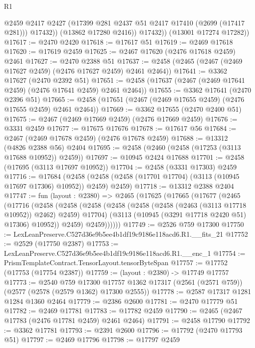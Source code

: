 \begin{lexlean}{R1}
\begin{coremodule}
                @2459
                @2417
                @2427
                (@17399 @281 @2437 @51 @2417 @17410 (@2699 (@17417 @281)))
                @17432))
            (@13862 @17280 @2416))
          @17432))
      (@13001 @17274 @17282))
@17617 := @2470 @2420
@17618 := @17617 @51
@17619 := @2469 @17618
@17620 := @17619 @2459
@17625 := @2467 @17620 (@2476 @17618 @2459) @2461
@17627 := @2470 @2388 @51
@17637 := @2458 (@2465 (@2467 (@2469 @17627 @2459) (@2476 @17627 @2459) @2461 @2464))
@17641 := @3362 @17627 (@2470 @2392 @51)
@17651 := @2458 (@17637 (@2467 (@2469 @17641 @2459) (@2476 @17641 @2459) @2461 @2464))
@17655 := @3362 @17641 (@2470 @2396 @51)
@17665 := @2458 (@17651 (@2467 (@2469 @17655 @2459) (@2476 @17655 @2459) @2461 @2464))
@17669 := @3362 @17655 (@2470 @2400 @51)
@17675 := @2467 (@2469 @17669 @2459) (@2476 @17669 @2459)
@17676 := @3331 @2459
@17677 := @17675 @17676
@17678 := @17617 @56
@17684 := @2467 (@2469 @17678 @2459) (@2476 @17678 @2459)
@17688 := @13312 (@4826 @2388 @56) @2404
@17695 := @2458 (@2460 (@2458 (@17253 (@3113 @17688 @10952)) @2459))
@17697 := @10945 @2424 @17688
@17701 := @2458 (@17695 (@3113 @17697 @10952))
@17704 := @2458 (@3331 @17303) @2459
@17716 := @17684
    (@2458 (@2458 (@2458 (@17701 @17704) (@3113 (@10945 @17697 @17306) @10952)) @2459) @2459)
@17718 := @13312 @2388 @2404
@17747 := fun (layout : @2380) =>
  @2465
    (@17625
      (@17665
        (@17677
          (@2465
            (@17716
              (@2458
                (@2458
                  (@2458
                    (@2458 (@2458 (@2458 (@2463 (@3113 @17718 @10952)) @2462) @2459) @17704)
                    (@3113 (@10945 (@3291 @17718 @2420 @51) @17306) @10952))
                  @2459)
                @2459))))))
@17749 := @2526 @759 @17300
@17750 := LexLeanPreserve.C527d36e9b5ee4b1df19c9186e118acd6.R1.__fits_21
@17752 := @2529 (@17750 @2387)
@17753 := LexLeanPreserve.C527d36e9b5ee4b1df19c9186e118acd6.R1.__enc_1
@17754 := PrismTemplateContract.TensorLayout.tensorByteSpan
@17757 := @17752 (@17753 (@17754 @2387))
@17759 := (layout : @2380) -> @17749 @17757
@17773 := @2540
    @759
    @17300
    @17757
    @1362
    @17317
    (@2561 (@2571 @759))
    (@2577 (@2578 (@2579 @1362) @17300 @2555))
@17778 := @2587 @17317 @1281 @1284 @1360 @2464
@17779 := @2386 @2600
@17781 := @2470 @17779 @51
@17782 := @2469 @17781
@17783 := @17782 @2459
@17790 := @2465 (@2467 @17783 (@2476 @17781 @2459) @2461 @2464)
@17791 := @2458 @17790
@17792 := @3362 @17781
@17793 := @2391 @2600
@17796 := @17792 (@2470 @17793 @51)
@17797 := @2469 @17796
@17798 := @17797 @2459

\end{coremodule}
\end{lexlean}
